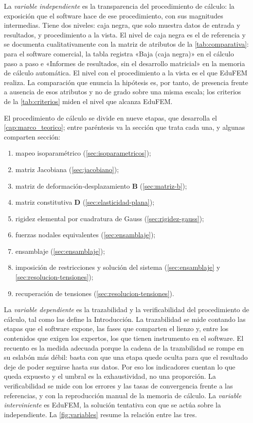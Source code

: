 La \emph{variable independiente} es la transparencia del procedimiento de cálculo: la exposición que el software hace de ese procedimiento, con sus magnitudes intermedias. Tiene dos niveles: caja negra, que solo muestra datos de entrada y resultados, y procedimiento a la vista. El nivel de caja negra es el de referencia y se documenta cualitativamente con la matriz de atributos de la \autoref{tab:comparativa}: para el software comercial, la tabla registra «Baja (caja negra)» en el cálculo paso a paso e «Informes de resultados, sin el desarrollo matricial» en la memoria de cálculo automática. El nivel con el procedimiento a la vista es el que EduFEM realiza. La comparación que enuncia la hipótesis es, por tanto, de presencia frente a ausencia de esos atributos y no de grado sobre una misma escala; los criterios de la \autoref{tab:criterios} miden el nivel que alcanza EduFEM.

El procedimiento de cálculo se divide en nueve etapas, que desarrolla el \autoref{cap:marco_teorico}; entre paréntesis va la sección que trata cada una, y algunas comparten sección:
\begin{enumerate}
    \item mapeo isoparamétrico (\autoref{sec:isoparametricos});
    \item matriz Jacobiana (\autoref{sec:jacobiano});
    \item matriz de deformación-desplazamiento $\bm{B}$ (\autoref{sec:matriz-b});
    \item matriz constitutiva $\bm{D}$ (\autoref{sec:elasticidad-plana});
    \item rigidez elemental por cuadratura de Gauss (\autoref{sec:rigidez-gauss});
    \item fuerzas nodales equivalentes (\autoref{sec:ensamblaje});
    \item ensamblaje (\autoref{sec:ensamblaje});
    \item imposición de restricciones y solución del sistema (\autoref{sec:ensamblaje} y \autoref{sec:resolucion-tensiones});
    \item recuperación de tensiones (\autoref{sec:resolucion-tensiones}).
\end{enumerate}

La \emph{variable dependiente} es la trazabilidad y la verificabilidad del procedimiento de cálculo, tal como las define la Introducción. La trazabilidad se mide contando las etapas que el software expone, las fases que comparten el lienzo y, entre los contenidos que exigen los expertos, los que tienen instrumento en el software. El recuento es la medida adecuada porque la cadena de la trazabilidad se rompe en su eslabón más débil: basta con que una etapa quede oculta para que el resultado deje de poder seguirse hasta sus datos. Por eso los indicadores cuentan lo que queda expuesto y el umbral es la exhaustividad, no una proporción. La verificabilidad se mide con los errores y las tasas de convergencia frente a las referencias, y con la reproducción manual de la memoria de cálculo. La \emph{variable interviniente} es EduFEM, la solución tentativa con que se actúa sobre la independiente. La \autoref{fig:variables} resume la relación entre las tres.

